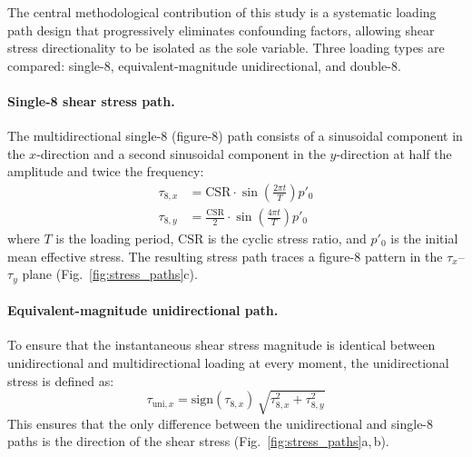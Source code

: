 The central methodological contribution of this study is a systematic loading path design that progressively eliminates confounding factors, allowing shear stress directionality to be isolated as the sole variable. Three loading types are compared: single-8, equivalent-magnitude unidirectional, and double-8.

\paragraph{Single-8 shear stress path.}
The multidirectional single-8 (figure-8) path consists of a sinusoidal component in the $x$-direction and a second sinusoidal component in the $y$-direction at half the amplitude and twice the frequency:
\begin{align}
  \tau_{8,x} &= \mathrm{CSR} \cdot \sin\!\left(\frac{2\pi t}{T}\right) p'_0
  \label{eq:tau_8x} \\
  \tau_{8,y} &= \frac{\mathrm{CSR}}{2} \cdot \sin\!\left(\frac{4\pi t}{T}\right) p'_0
  \label{eq:tau_8y}
\end{align}
where $T$ is the loading period, $\mathrm{CSR}$ is the cyclic stress ratio, and $p'_0$ is the initial mean effective stress. The resulting stress path traces a figure-8 pattern in the $\tau_x$--$\tau_y$ plane (Fig.~\ref{fig:stress_paths}c).

\paragraph{Equivalent-magnitude unidirectional path.}
To ensure that the instantaneous shear stress magnitude is identical between unidirectional and multidirectional loading at every moment, the unidirectional stress is defined as:
\begin{equation}
  \tau_{\mathrm{uni},x}
    = \mathrm{sign}(\tau_{8,x})\,
      \sqrt{\tau_{8,x}^2 + \tau_{8,y}^2}
  \label{eq:tau_uni}
\end{equation}
This ensures that the only difference between the unidirectional and single-8 paths is the direction of the shear stress (Fig.~\ref{fig:stress_paths}a,\,b).

